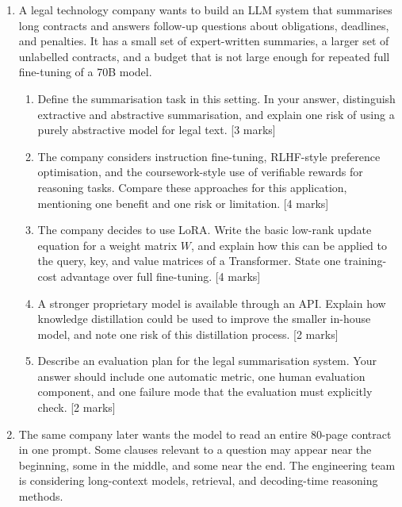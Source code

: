 \documentclass[11pt,a4paper]{article}
\newcommand{\pts}[1]{\hfill [#1 marks]}
\begin{document}
\begin{enumerate}[leftmargin=*]

\item A legal technology company wants to build an LLM system that summarises long contracts and answers follow-up questions about obligations, deadlines, and penalties. It has a small set of expert-written summaries, a larger set of unlabelled contracts, and a budget that is not large enough for repeated full fine-tuning of a 70B model.

\begin{enumerate}
\item Define the summarisation task in this setting. In your answer, distinguish extractive and abstractive summarisation, and explain one risk of using a purely abstractive model for legal text. \pts{3}

\item The company considers instruction fine-tuning, RLHF-style preference optimisation, and the coursework-style use of verifiable rewards for reasoning tasks. Compare these approaches for this application, mentioning one benefit and one risk or limitation. \pts{4}

\item The company decides to use LoRA. Write the basic low-rank update equation for a weight matrix \(W\), and explain how this can be applied to the query, key, and value matrices of a Transformer. State one training-cost advantage over full fine-tuning. \pts{4}

\item A stronger proprietary model is available through an API. Explain how knowledge distillation could be used to improve the smaller in-house model, and note one risk of this distillation process. \pts{2}

\item Describe an evaluation plan for the legal summarisation system. Your answer should include one automatic metric, one human evaluation component, and one failure mode that the evaluation must explicitly check. \pts{2}
\end{enumerate}

\newpage

\item The same company later wants the model to read an entire 80-page contract in one prompt. Some clauses relevant to a question may appear near the beginning, some in the middle, and some near the end. The engineering team is considering long-context models, retrieval, and decoding-time reasoning methods.


\end{enumerate}
\end{document}
